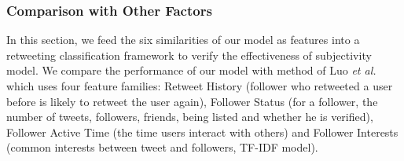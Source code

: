 \documentclass[twocolumn]{svjour3}          %
\begin{document}
\subsubsection{Comparison with Other Factors}
\label{classifiction}

In this section, we feed the six similarities of our model as features into a retweeting classification framework to verify the effectiveness of subjectivity model. 
We compare the performance of our model with method of Luo \emph{et al.}~\cite{Luo:2013RMF} which uses four feature families: Retweet History (follower who retweeted a user before is likely to retweet the user again), Follower Status (for a follower, the number of tweets, followers, friends, being listed and whether he is verified), Follower Active Time (the time users interact with others) and Follower Interests (common interests between tweet and followers, TF-IDF model).
\end{document}
